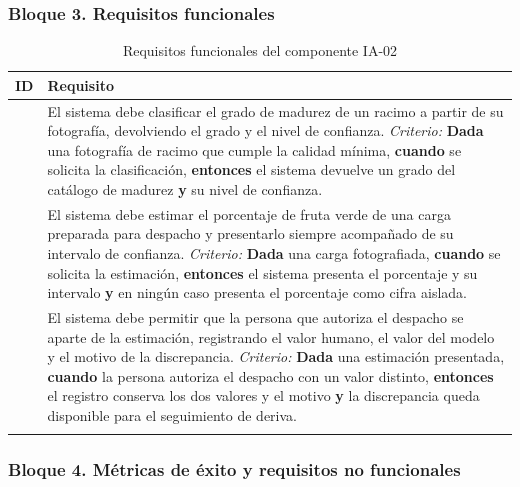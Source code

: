 \subsubsection*{Bloque 3. Requisitos funcionales}

\begin{longtable}{|C{2.1cm}|L{13.3cm}|}
\hline
{}\textbf{ID} & \textbf{Requisito}\\ \hline
\endhead
{} & El sistema debe clasificar el grado de madurez de un racimo a partir de su fotografía, devolviendo el grado y el nivel de confianza. \newline \emph{Criterio:} \textbf{Dada} una fotografía de racimo que cumple la calidad mínima, \textbf{cuando} se solicita la clasificación, \textbf{entonces} el sistema devuelve un grado del catálogo de madurez \textbf{y} su nivel de confianza. \\ \hline
{} & El sistema debe estimar el porcentaje de fruta verde de una carga preparada para despacho y presentarlo siempre acompañado de su intervalo de confianza. \newline \emph{Criterio:} \textbf{Dada} una carga fotografiada, \textbf{cuando} se solicita la estimación, \textbf{entonces} el sistema presenta el porcentaje y su intervalo \textbf{y} en ningún caso presenta el porcentaje como cifra aislada. \\ \hline
{} & El sistema debe permitir que la persona que autoriza el despacho se aparte de la estimación, registrando el valor humano, el valor del modelo y el motivo de la discrepancia. \newline \emph{Criterio:} \textbf{Dada} una estimación presentada, \textbf{cuando} la persona autoriza el despacho con un valor distinto, \textbf{entonces} el registro conserva los dos valores y el motivo \textbf{y} la discrepancia queda disponible para el seguimiento de deriva. \\ \hline
\caption{Requisitos funcionales del componente IA-02}
\end{longtable}

\subsubsection*{Bloque 4. Métricas de éxito y requisitos no funcionales}

